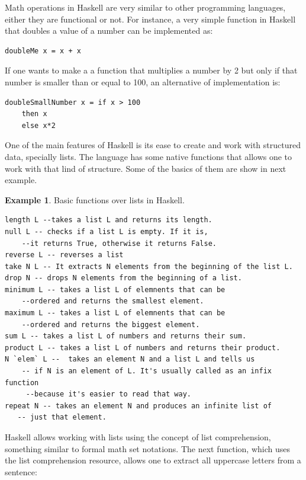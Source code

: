 \documentclass[oneside,12pt]{scrbook}
\theoremstyle{definition}
\newtheorem{Example}{Example}
\theoremstyle{plain}
\theoremstyle{definition}
\begin{document}
Math operations in Haskell are very similar to other programming languages, either they are functional or not. For instance, a very simple function in Haskell that doubles a value of a number can be implemented as:

\begin{verbatim}
doubleMe x = x + x 
\end{verbatim}

If one wants to make a a function that multiplies a number by 2 but only if that number is smaller than or equal to 100, an alternative of implementation is:

\begin{verbatim}
doubleSmallNumber x = if x > 100  
	then x  
	else x*2
\end{verbatim}


One of the main features of Haskell is its ease to create and work with structured data, specially lists. The language has some native functions that allows one to work with that lind of structure. Some of the basics of them are show in next example.
\begin{Example}
	Basic functions over lists in Haskell.
	\begin{verbatim}
length L --takes a list L and returns its length.
null L -- checks if a list L is empty. If it is, 
	--it returns True, otherwise it returns False.
reverse L -- reverses a list
take N L -- It extracts N elements from the beginning of the list L.
drop N -- drops N elements from the beginning of a list.
minimum L -- takes a list L of elemnents that can be 
	--ordered and returns the smallest element.
maximum L -- takes a list L of elemnents that can be 
    --ordered and returns the biggest element.
sum L -- takes a list L of numbers and returns their sum.
product L -- takes a list L of numbers and returns their product.
N `elem` L --  takes an element N and a list L and tells us
    -- if N is an element of L. It's usually called as an infix function
     --because it's easier to read that way.
repeat N -- takes an element N and produces an infinite list of 
   -- just that element.
	\end{verbatim}
	
\end{Example}

Haskell allows working with lists using the concept of list comprehension, something similar to formal math set notations. The next function, which uses the list comprehension resource, allows one to extract all uppercase letters from a sentence:
\end{document}
